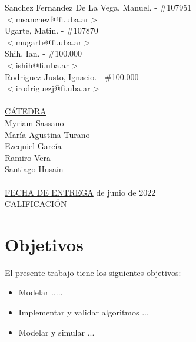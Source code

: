 \begin{titlepage}
\begin{tabbing}
		Sanchez Fernandez De La Vega, Manuel.	\>\>- \#107951\\
		\>\footnotesize{$<$msanchezf@fi.uba.ar$>$}\\
		Ugarte, Matin.	\>\>- \#107870\\
		\>\footnotesize{$<$mugarte@fi.uba.ar$>$}\\
		Shih, Ian.	\>\>- \#100.000\\
		\>\footnotesize{$<$ishih@fi.uba.ar$>$}\\
		Rodriguez Justo, Ignacio.	\>\>- \#100.000\\
        \>\footnotesize{$<$irodriguezj@fi.uba.ar$>$}\\
        
        \\
        
		\<\underline{CÁTEDRA}\\[0.2cm]
		Myriam Sassano \\
		María Agustina Turano \\
		Ezequiel García \\
		Ramiro Vera \\
		Santiago Husain \\[0.2cm]
		
		 \\
		
		\<\underline{FECHA DE ENTREGA}\>\> de junio de 2022
		\\[0.2cm]
		\<\underline{CALIFICACIÓN}\>\>\> 
		\\[0.2cm]
		
	\end{tabbing}
	
	
	
	
\end{titlepage}

\clearpage

\tableofcontents							

\clearpage

\clearpage
\section{Objetivos}
El presente trabajo tiene los siguientes objetivos:
\begin{itemize}
	\item Modelar .....
	\item Implementar y validar algoritmos ...
	\item Modelar y simular ...
\end{itemize}

